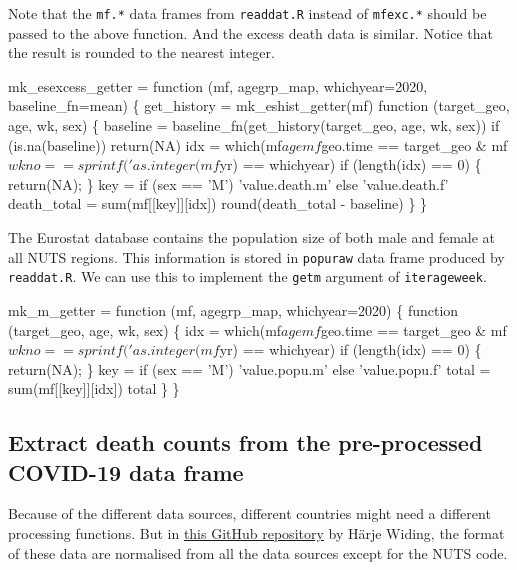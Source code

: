 \documentclass{article}
\begin{document}
Note that the {\tt{}mf.*} data frames from {\tt{}readdat.R} instead of {\tt{}mfexc.*} should
be passed to the above function. And the excess death data is similar. Notice that
the result is rounded to the nearest integer.

\nwenddocs{}\endmoddef
mk_esexcess_getter = function (mf, agegrp_map, whichyear=2020, baseline_fn=mean) \{
    get_history = mk_eshist_getter(mf)
    function (target_geo, age, wk, sex) \{
        baseline = baseline_fn(get_history(target_geo, age, wk, sex))
        if (is.na(baseline)) return(NA)
        idx = which(mf$age %
                    mf$geo.time == target_geo &
                    mf$wkno == sprintf('%
                    as.integer(mf$yr) == whichyear)
        if (length(idx) == 0) \{ return(NA); \}
        key = if (sex == 'M') 'value.death.m' else 'value.death.f'
        death_total = sum(mf[[key]][idx])
        round(death_total - baseline)
    \}
\}
\nwendcode{}\nwdocspar

The Eurostat database contains the population size of both male and female
at all NUTS regions. This information is stored in {\tt{}popuraw} data frame
produced by {\tt{}readdat.R}. We can use this to implement the {\tt{}get{}m} argument
of {\tt{}iter{}ageweek}.

\nwenddocs{}\endmoddef
mk_m_getter = function (mf, agegrp_map, whichyear=2020) \{
    function (target_geo, age, wk, sex) \{
        idx = which(mf$age %
                    mf$geo.time == target_geo &
                    mf$wkno == sprintf('%
                    as.integer(mf$yr) == whichyear)
        if (length(idx) == 0) \{ return(NA); \}
        key = if (sex == 'M') 'value.popu.m' else 'value.popu.f'
        total = sum(mf[[key]][idx])
        total
    \}
\}
\nwendcode{}\nwdocspar

\subsection{Extract death counts from the pre-processed COVID-19 data frame}

Because of the different data sources, different countries might need a different processing functions. But
in \href{https://github.com/harjew/COVID-19-Data/tree/master/covid-data}{this GitHub repository} by Härje Widing, the
format of these data are normalised from all the data sources except for the \textsc{NUTS} code.
\end{document}
